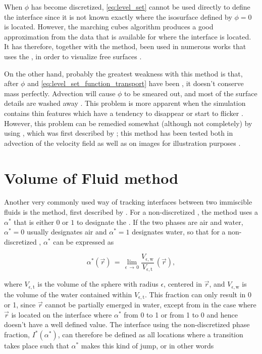 When $\phi$ has become discretized, \eqref{eq:level_set} cannot be used directly to define the interface since it is not known exactly where the isosurface defined by $\phi = 0$ is located. However, the marching cubes algorithm produces a good approximation from the data that is available for where the interface is located. It has therefore, together with the \LS method, been used in numerous works that uses the \FVM, in order to visualize free surfaces \citep[e.g.][]{Losasso2004}.

On the other hand, probably the greatest weakness with this method is that, after $\phi$ and \eqref{eq:level_set_function_transport} have been \discretized, it doesn't conserve mass perfectly. Advection will cause $\phi$ to be smeared out, and most of the surface details are washed away \citep{Wojtan2009}. This problem is more apparent when the simulation contains thin features which have a tendency to disappear or start to flicker \citep{nthuerey2009}. However, this problem can be remedied somewhat (although not completely) by using \BFECC, which was first described by \citet{Dupont2003}; this method has been tested both in advection of the velocity field as well as on images for illustration purposes \citep{Kim2005}.

\section{Volume of Fluid method}

Another very commonly used way of tracking interfaces between two immiscible fluids is the \VOF method, first described by \citet{Hirt1981}. For a non-discretized \PDE, the \VOF method uses a  $\alpha^*$ that is either $0$ or $1$ to designate the \phase. If the two phases are air and water, $\alpha^* = 0$ usually designates air and $\alpha^* = 1$ designates water, so that for a non-discretized \PDE, $\alpha^*$ can be expressed as

\begin{equation} \label{eq:phase_fraction_continuous}
\alpha^*(\vec{r}) \,=\, \lim_{\epsilon\,\rightarrow\,0} \frac{V_{\epsilon,\text{w}}}{V_{\epsilon,\text{t}}}\,(\vec{r}),
\end{equation}

where $V_{\epsilon,\text{t}}$ is the volume of the sphere with radius $\epsilon$, centered in $\vec{r}$, and $V_{\epsilon,\text{w}}$ is the volume of the water contained within $V_{\epsilon,\text{t}}$. This fraction can only result in 0 or 1, since $\vec{r}$ cannot be partially emerged in water, except from in the case where $\vec{r}$ is located on the interface where $\alpha^*$  from 0 to 1 or from 1 to 0 and hence doesn't have a well defined value. The interface using the non-discretized phase fraction, $I^*(\alpha^*)$, can therefore be defined as all locations where a transition takes place such that $\alpha^*$ makes this kind of jump, or in other words

